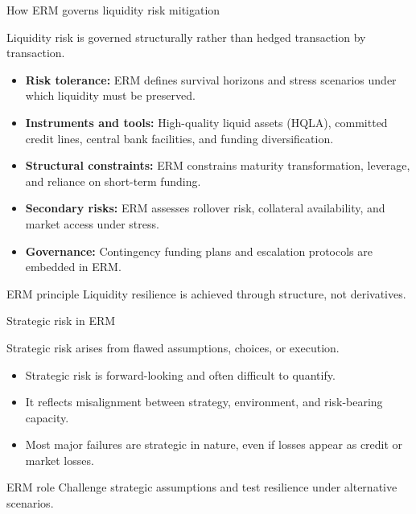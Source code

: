 \documentclass[aspectratio=169, 10pt]{beamer} %
\begin{document}
\begin{frame}{How ERM governs liquidity risk mitigation}

Liquidity risk is governed structurally rather than hedged transaction by transaction.

\medskip

\begin{itemize}
  \item[$\bullet$] \textbf{Risk tolerance:} ERM defines survival horizons and
  stress scenarios under which liquidity must be preserved.

  \item[$\bullet$] \textbf{Instruments and tools:} High-quality liquid assets
  (HQLA), committed credit lines, central bank facilities, and funding
  diversification.

  \item[$\bullet$] \textbf{Structural constraints:} ERM constrains maturity
  transformation, leverage, and reliance on short-term funding.

  \item[$\bullet$] \textbf{Secondary risks:} ERM assesses rollover risk,
  collateral availability, and market access under stress.

  \item[$\bullet$] \textbf{Governance:} Contingency funding plans and escalation
  protocols are embedded in ERM.
\end{itemize}

\begin{block}{ERM principle}
Liquidity resilience is achieved through structure, not derivatives.
\end{block}

\end{frame}


\begin{frame}{Strategic risk in ERM}

Strategic risk arises from flawed assumptions, choices, or execution.

\medskip

\begin{itemize}
  \item[$\bullet$] Strategic risk is forward-looking and often difficult
  to quantify.

  \item[$\bullet$] It reflects misalignment between strategy, environment,
  and risk-bearing capacity.

  \item[$\bullet$] Most major failures are strategic in nature, even if
  losses appear as credit or market losses.
\end{itemize}

\begin{block}{ERM role}
Challenge strategic assumptions and test resilience under alternative scenarios.
\end{block}

\end{frame}
\end{document}
